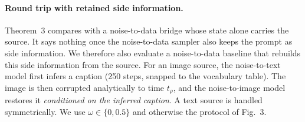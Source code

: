 \paragraph{Round trip with retained side information.}\label{app:n2d-side-info}
Theorem~3 compares \BIT{} with a noise-to-data bridge whose state alone carries the source.
It says nothing once the noise-to-data sampler also keeps the prompt as side information.
We therefore also evaluate a noise-to-data baseline that rebuilds this side information
from the source. For an image source, the noise-to-text model first infers a caption
(250 steps, snapped to the vocabulary table). The image is then corrupted analytically
to time $t_\rho$, and the noise-to-image model restores it \emph{conditioned on the
inferred caption}. A text source is handled symmetrically. We use $\omega\in\{0,0.5\}$ and
otherwise the protocol of Fig.~3.
